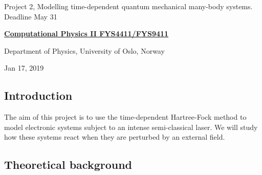 \documentclass[%
oneside,                 %
final,                   %
10pt]{article}
\begin{document}

\newcommand{\exercisesection}[1]{\subsection*{#1}}






\thispagestyle{empty}

\begin{center}
{\LARGE\bf
\begin{spacing}{1.25}
Project 2, Modelling time-dependent quantum mechanical many-body systems. Deadline May 31
\end{spacing}
}
\end{center}


\begin{center}
{\bf \href{{http://www.uio.no/studier/emner/matnat/fys/FYS4411/index-eng.html}}{Computational Physics II FYS4411/FYS9411}}
\end{center}

    \begin{center}
\centerline{{\small Department of Physics, University of Oslo, Norway}}
\end{center}
    

\begin{center}
Jan 17, 2019
\end{center}

\vspace{1cm}


\subsection*{Introduction}

The aim of this project is to use the time-dependent Hartree-Fock method to
model electronic systems subject to an intense semi-classical laser. We will
study how these systems react when they are perturbed by an external field.


\subsection*{Theoretical background}
\end{document}
